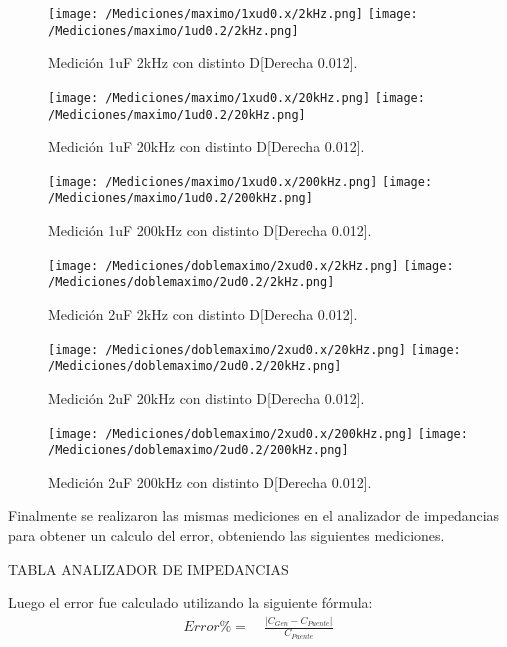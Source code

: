 \begin{figure}[H]
	\centering
	\texttt{[image: /Mediciones/maximo/1xud0.x/2kHz.png]}
	\texttt{[image: /Mediciones/maximo/1ud0.2/2kHz.png]}
\caption{Medición 1uF 2kHz con distinto D[Derecha 0.012].}
	\label{fig:fcon}
\end{figure}
\begin{figure}[H]
	\centering
	\texttt{[image: /Mediciones/maximo/1xud0.x/20kHz.png]}
	\texttt{[image: /Mediciones/maximo/1ud0.2/20kHz.png]}
\caption{Medición 1uF 20kHz con distinto D[Derecha 0.012].}
	\label{fig:fcon}
\end{figure}
\begin{figure}[H]
	\centering
	\texttt{[image: /Mediciones/maximo/1xud0.x/200kHz.png]}
	\texttt{[image: /Mediciones/maximo/1ud0.2/200kHz.png]}
\caption{Medición 1uF 200kHz con distinto D[Derecha 0.012].}
	\label{fig:fcon}
\end{figure}
\begin{figure}[H]
	\centering
	\texttt{[image: /Mediciones/doblemaximo/2xud0.x/2kHz.png]}
	\texttt{[image: /Mediciones/doblemaximo/2ud0.2/2kHz.png]}
\caption{Medición 2uF 2kHz con distinto D[Derecha 0.012].}
	\label{fig:fcon}
\end{figure}
\begin{figure}[H]
	\centering
	\texttt{[image: /Mediciones/doblemaximo/2xud0.x/20kHz.png]}
	\texttt{[image: /Mediciones/doblemaximo/2ud0.2/20kHz.png]}
\caption{Medición 2uF 20kHz con distinto D[Derecha 0.012].}
	\label{fig:fcon}
\end{figure}
\begin{figure}[H]
	\centering
	\texttt{[image: /Mediciones/doblemaximo/2xud0.x/200kHz.png]}
	\texttt{[image: /Mediciones/doblemaximo/2ud0.2/200kHz.png]}
\caption{Medición 2uF 200kHz con distinto D[Derecha 0.012].}
	\label{fig:fcon}
\end{figure}
Finalmente se realizaron las mismas mediciones en el analizador de impedancias para obtener un calculo del error, obteniendo las siguientes mediciones.\\
{\centering 
\begin{Huge}
\color{red} 
TABLA ANALIZADOR DE IMPEDANCIAS
\end{Huge}
}
Luego el error fue calculado utilizando la siguiente fórmula:
\begin{equation*}
\begin{split}
	 Error \% =& \ \frac{|C_{Gen}-C_{Puente}|}{C_{Puente}}\ 
\end{split}
\end{equation*}

